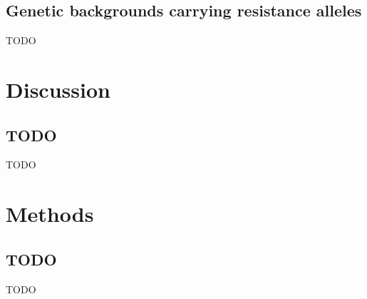 \documentclass[a4paper,11pt,abstracton,hidelinks]{scrartcl}
\newcommand{\beginsupplement}{%
  \setcounter{table}{0}
  \renewcommand{\thetable}{S\arabic{table}}%
  \setcounter{figure}{0}
  \renewcommand{\thefigure}{S\arabic{figure}}%
}
\begin{document}
\subsection*{Genetic backgrounds carrying resistance alleles}


TODO


\section*{Discussion}


\subsection*{TODO}


TODO


\section*{Methods}


\subsection*{TODO}

TODO


\printbibliography


\beginsupplement
\clearpage


\end{document}
